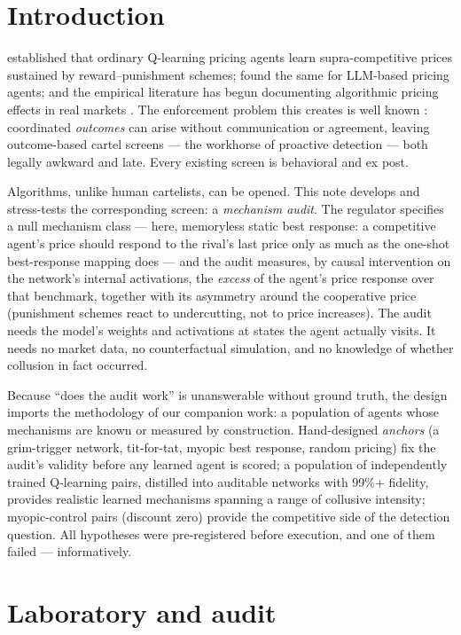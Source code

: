 \documentclass[11pt]{article}
\begin{document}
\section{Introduction}\label{sec:intro}

\citet{calvano2020} established that ordinary Q-learning pricing agents
learn supra-competitive prices sustained by reward--punishment schemes;
\citet{fish2024} found the same for LLM-based pricing agents; and the
empirical literature has begun documenting algorithmic pricing effects in
real markets \citep{assad2024}. The enforcement problem this creates is
well known \citep{harrington2018}: coordinated \emph{outcomes} can arise
without communication or agreement, leaving outcome-based cartel screens
--- the workhorse of proactive detection --- both legally awkward and
late. Every existing screen is behavioral and ex post.

Algorithms, unlike human cartelists, can be opened. This note develops and
stress-tests the corresponding screen: a \emph{mechanism audit}. The
regulator specifies a null mechanism class --- here, memoryless static best
response: a competitive agent's price should respond to the rival's last
price only as much as the one-shot best-response mapping does --- and the
audit measures, by causal intervention on the network's internal
activations, the \emph{excess} of the agent's price response over that
benchmark, together with its asymmetry around the cooperative price
(punishment schemes react to undercutting, not to price increases). The
audit needs the model's weights and activations at states the agent
actually visits. It needs no market data, no counterfactual simulation, and
no knowledge of whether collusion in fact occurred.

Because ``does the audit work'' is unanswerable without ground truth, the
design imports the methodology of our companion work: a population of
agents whose mechanisms are known or measured by construction. Hand-designed
\emph{anchors} (a grim-trigger network, tit-for-tat, myopic best response,
random pricing) fix the audit's validity before any learned agent is
scored; a population of independently trained Q-learning pairs, distilled
into auditable networks with 99\%+ fidelity, provides realistic learned
mechanisms spanning a range of collusive intensity; myopic-control pairs
(discount zero) provide the competitive side of the detection question.
All hypotheses were pre-registered before execution, and one of them
failed --- informatively.

\section{Laboratory and audit}\label{sec:lab}
\end{document}
